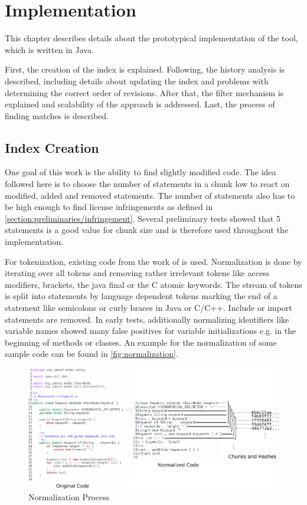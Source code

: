 
\chapter{Implementation}\label{chapter:implementation}
This chapter describes details about the prototypical implementation of the tool, which is written in Java.

First, the creation of the index is explained.
Following, the history analysis is described, including details about updating the index and problems with determining the correct order of revisions.
After that, the filter mechanism is explained and scalability of the approach is addressed.
Last, the process of finding matches is described.


\section{Index Creation}\label{section:implementation/index_creation}
One goal of this work is the ability to find slightly modified code.
The idea followed here is to choose the number of statements in a chunk low to react on modified, added and removed statements.
The number of statements also has to be high enough to find license infringements as defined in \autoref{section:preliminaries/infringement}.
Several preliminary tests showed that 5 statements is a good value for chunk size and is therefore used throughout the implementation.

For tokenization, existing code from the work of \cite{heinemann2014teamscale} is used.
Normalization is done by iterating over all tokens and removing rather irrelevant tokens like access modifiers, brackets, the java final or the C atomic keywords.
The stream of tokens is split into statements by language dependent tokens marking the end of a statement like semicolons or curly braces in Java or C/C++.
Include or import statements are removed.
In early tests, additionally normalizing identifiers like variable names showed many false positives for variable initializations e.g. in the beginning of methods or classes.
An example for the normalization of some sample code can be found in \autoref{fig:normalization}.

\begin{figure}[h]
	\centering
	\includegraphics[width=\linewidth]{figures/normalization.pdf}
	\caption{Normalization Process}\label{fig:normalization}
\end{figure}

